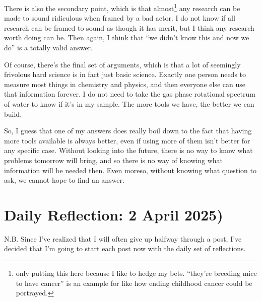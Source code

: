 \documentclass[12pt]{article}[titlepage]
\newcommand{\say}[1]{``#1''}
\renewcommand{\,}{\textsuperscript{,}}
\begin{document}
There is also the secondary point, which is that almost\footnote{only putting this here because I like to hedge my bets. \say{they're breeding mice to have cancer} is an example for like how ending childhood cancer could be portrayed.} any research can be made to sound ridiculous when framed by a bad actor.  
I do not know if all research can be framed to sound as though it has merit, but I think any research worth doing can be.  
Then again, I think that \say{we didn't know this and now we do} is a totally valid answer.

Of course, there's the final set of arguments, which is that a lot of seemingly frivolous hard science is in fact just basic science.  
Exactly one person needs to measure most things in chemistry and physics, and then everyone else can use that information forever.  
I do not need to take the gas phase rotational spectrum of water to know if it's in my sample.  
The more tools we have, the better we can build.

So, I guess that one of my answers does really boil down to the fact that having more tools available is always better, even if using more of them isn't better for any specific case.  
Without looking into the future, there is no way to know what problems tomorrow will bring, and so there is no way of knowing what information will be needed then.  
Even moreso, without knowing what question to ask, we cannot hope to find an answer.

\section{Daily Reflection: 2 April 2025)}  
N.B. Since I've realized that I will often give up halfway through a post, I've decided that I'm going to start each post now with the daily set of reflections.
\end{document}
